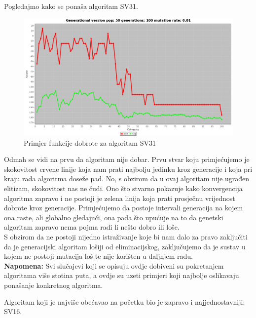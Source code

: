 \documentclass[times, utf8, zavrsni]{fer}
\begin{document}
	Pogledajmo kako se ponaša algoritam SV31. 
	
	\begin{figure}[H]
		\centering
		\includegraphics[width=18cm]{slike/SV31Hibrid.png}
		\caption{Primjer funkcije dobrote za algoritam SV31}
		\label{fig:sv31-alg-hibrid}
	\end{figure} 
	
	
	Odmah se vidi na prvu da algoritam nije dobar. Prvu stvar koju primjećujemo je skokovitost crvene linije koja nam prati najbolju jedinku kroz generacije i koja pri kraju rada algoritma doseže pad. No, s obzirom da u ovaj algoritam nije ugrađen elitizam, skokovitost nas ne čudi. Ono što stvarno pokazuje kako konvergencija algoritma zapravo i ne postoji je zelena linija koja prati prosječnu vrijednost dobrote kroz generacije. Primjećujemo da postoje intervali generacija na kojem ona raste, ali globalno gledajući, ona pada što upućuje na to da genetski algoritam zapravo nema pojma radi li nešto dobro ili loše.\\
	S obzirom da ne postoji nijedno istraživanje koje bi nam dalo za pravo zaključiti da je generacijski algoritam lošiji od eliminacijskog, zaključujemo da je sustav u kojem ne postoji mutacija loš te nije korišten u daljnjem radu. \\
	\textbf{Napomena: } Svi slučajevi koji se opisuju ovdje dobiveni su pokretanjem algoritama više stotina puta, a ovdje su uzeti primjeri koji najbolje oslikavaju ponašanje konkretnog algoritma.  
	
	Algoritam koji je najviše obećavao na početku bio je zapravo i najjednostavniji: SV16. 
	
\end{document}
